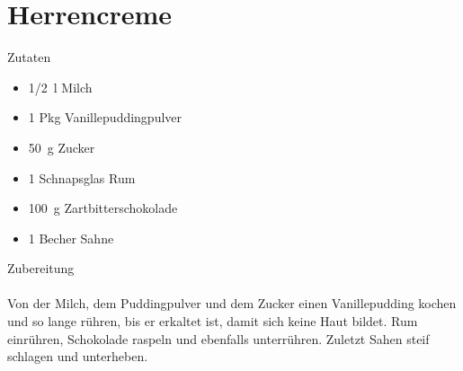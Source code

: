 \section*{Herrencreme}
\ihead{}\ohead{}
\cfoot{}
{\Large Zutaten}
\begin{multicols}{2}
\begin{itemize}
    \item \SI{1/2}{l} Milch
    \item \num{1} Pkg Vanillepuddingpulver
    \item \SI{50}{g} Zucker
    \item \num{1} Schnapsglas Rum
    \item \SI{100}{g} Zartbitterschokolade
    \item \num{1} Becher Sahne
\end{itemize}
\end{multicols}
\noindent
{\Large Zubereitung}\\
\\
Von der Milch, dem Puddingpulver und dem Zucker einen Vanillepudding kochen und so lange rühren, bis er erkaltet ist, damit sich keine Haut bildet.
Rum einrühren, Schokolade raspeln und ebenfalls unterrühren. 
Zuletzt Sahen steif schlagen und unterheben.
